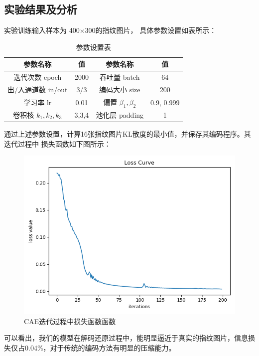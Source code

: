 \documentclass{whutmod}
\begin{document}
        \subsection{实验结果及分析}
        实验训练输入样本为 400×300的指纹图片， 具体参数设置如表所示：
       \begin{table}[H]
        	\centering		
        	\caption{参数设置表
        	}
        	\begin{tabular}{cc|cc}
        		\toprule[1.5pt]
        		\multicolumn{1}{m{5cm}}{\centering 参数名称}
        		& \multicolumn{1}{m{2cm}}{\centering 值}
        		& \multicolumn{1}{m{5cm}}{\centering 参数名称}
        		& \multicolumn{1}{m{2cm}}{\centering 值}
        		\\
        		\midrule[1pt]
        		迭代次数 epoch&   2000& 吞吐量 batch & 64\\ 
        	出/入通道数 in/out& 	3/3& 编码大小 size& 200\\
        	        学习率 lr& 0.01& 偏置 $\beta_1,\beta_2$& 0.9, 0.999\\
      卷积核 $k_1,k_2,k_3$& 3,3,4& 池化层 padding& 1\\
        		\bottomrule[1.5pt]	
        	\end{tabular}
        \end{table}
    
        通过上述参数设置，计算16张指纹图片KL散度的最小值，并保存其编码程序。其迭代过程中 损失函数如下图所示：
        	\begin{figure}[H]
        	\centering
        	\includegraphics[width=.6\textwidth]{figures/loss.png}
        	\caption{CAE迭代过程中损失函数函数}\label{loss}
        \end{figure}
    可以看出，我们的模型在解码还原过程中，能明显逼近于真实的指纹图片，信息损失仅占0.04\%，对于传统的编码方法有明显的压缩能力。
    
\end{document}
